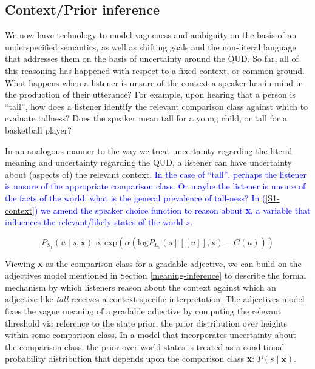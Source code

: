 \documentclass{sp}
\newcommand{\gcs}[1]{\textcolor{blue}{[gcs: #1]}}
\newcommand{\gs}[1]{\textcolor{blue}{#1}}
\newcommand{\mf}[1]{\textcolor{orange}{[mf: #1]}}
\newcommand{\mht}[1]{\textcolor{purple}{[mht: #1]}}
\newcommand{\sem}[1]{\ensuremath{[\![#1]\!]}}
\begin{document}


\subsection{Context/Prior inference}

We now have technology to model vagueness and ambiguity on the basis of an underspecified semantics, as well as shifting goals and the non-literal language that addresses them on the basis of uncertainty around the QUD. So far, all of this reasoning has happened with respect to a fixed context, or common ground. What happens when a listener is unsure of the context a speaker has in mind in the production of their utterance? %
For example, upon hearing that a person is ``tall'', how does a listener identify the relevant comparison class against which to evaluate tallness? Does the speaker mean tall for a young child, or tall for a basketball player?

In an analogous manner to the way we treat uncertainty regarding the literal meaning and uncertainty regarding the QUD, a listener can have uncertainty about (aspects of) the relevant context. \gs{In the case of ``tall'', perhaps the listener is unsure of the appropriate comparison class. Or maybe the listener is unsure of the facts of the world: what is the general prevalence of tall-ness? In (\ref{S1-context}) we amend the speaker choice function to reason about \textbf{x}, a variable that influences the relevant/likely states of the world $s$.}

\begin{equation} \label{S1-context}
P_{S_1}(u\mid s, \textbf{x}) \propto \textrm{exp}(\alpha (\textrm{log}P_{L_0}(s\mid \sem{u}, \textbf{x}) - C(u)))
\end{equation}

Viewing \textbf{x} as the comparison class for a gradable adjective, we can build on the \citeauthor{lassitergoodman2013} adjectives model mentioned in Section \ref{meaning-inference} to describe the formal mechanism by which listeners reason about the context against which an adjective like \emph{tall} receives a context-specific interpretation. The adjectives model fixes the vague meaning of a gradable adjective by computing the relevant threshold via reference to the state prior, the prior distribution over heights within some comparison class. In a model that incorporates uncertainty about the comparison class, the prior over world states is treated as a conditional probability distribution that depends upon the comparison class \textbf{x}: $P(s\mid \textbf{x})$.
\end{document}
